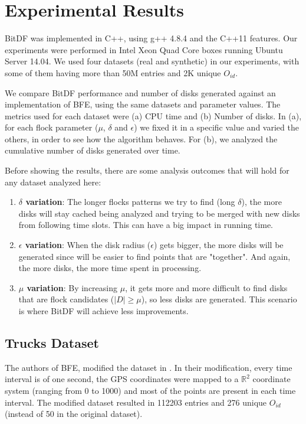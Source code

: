 \chapter{Experimental Results}
\label{chp:results}
BitDF was implemented in C++, using g++ 4.8.4 and the C++11 features. Our experiments were performed in Intel Xeon Quad
Core boxes running Ubuntu Server 14.04. We used four datasets (real and synthetic) in our experiments, with some of them
having more than 50M entries and 2K unique $O_{id}$.

We compare BitDF performance and number of disks generated against an implementation of BFE, using the same datasets
and parameter values. The metrics used for each dataset were (a) CPU time and (b) Number of disks. In (a), for each
flock parameter ($\mu$, $\delta$ and $\epsilon$) we fixed it in a specific value and varied the others, in order to see
how the algorithm behaves. For (b), we analyzed the cumulative number of disks generated over time.

Before showing the results, there are some analysis outcomes that will hold for any dataset analyzed here:

\begin{enumerate}
    \item \textbf{$\delta$ variation}: The longer flocks patterns we try to find (long $\delta$), the more disks will
        stay cached being analyzed and trying to be merged with new disks from following time slots. This can have a big
        impact in running time.\label{sssec:lvariation}

    \item \textbf{$\epsilon$ variation}: When the disk radius ($\epsilon$) gets bigger, the more disks will be generated
        since will be easier to find points that are "together". And again, the more disks, the more time spent in
        processing. \label{sssec:gvariation}

    \item \textbf{$\mu$ variation}: By increasing $\mu$, it gets more and more difficult to find disks that are flock
        candidates ($|D| \ge \mu$), so less disks are generated. This scenario is where BitDF will achieve less
        improvements. \label{sssec:nvariation}
\end{enumerate}

\section{Trucks Dataset}
\label{subsec:trucks}
The authors of BFE, modified the dataset in \citep{trucksdataset}. In their modification, every time interval is of
one second, the GPS coordinates were mapped to a $\mathbb{R}^2$ coordinate system (ranging from 0 to 1000) and most of
the points are present in each time interval. The modified dataset resulted in 112203 entries and 276 unique $O_{id}$
(instead of 50 in the original dataset).

